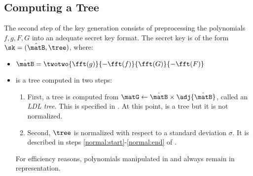   \begin{algorithm}[!htp]
  \caption{$\reduce(f,g,F,G)$}\label{alg:reduce}
 \begin{algorithmic}[1]

  \Do
  \end{algorithmic}
 \end{algorithm}

\clearpage

\subsection{Computing a \falcon Tree} \label{sec:spec:keygen:ffldl}

 The second step of the key generation consists of preprocessing the polynomials $f,g,F,G$ into an adequate secret key format. The secret key is of the form $\sk = (\hat\matB, \tree)$, where:
 \begin{itemize}
 \item $\hat\matB = \twotwo{\fft(g)}{-\fft(f)}{\fft(G)}{-\fft(F)}$
 \item \tree is a \falcon tree computed in two steps:
 \begin{enumerate}
 \item First, a tree \tree is computed from $\matG \gets \hat \matB \times \adj{\hat\matB}$, called an \emph{LDL tree}. This is specified in \longffldl. At this point, \tree is a \falcon tree but it is not normalized.
 \item Second, $\tree$ is normalized with respect to a standard deviation $\sigma$. It is described in steps \ref{normal:start}-\ref{normal:end} of \longkeygen.
 \end{enumerate}
 For efficiency reasons, polynomials manipulated in \longldlalgo and \longffldl always remain in \fft representation.
 \end{itemize}

